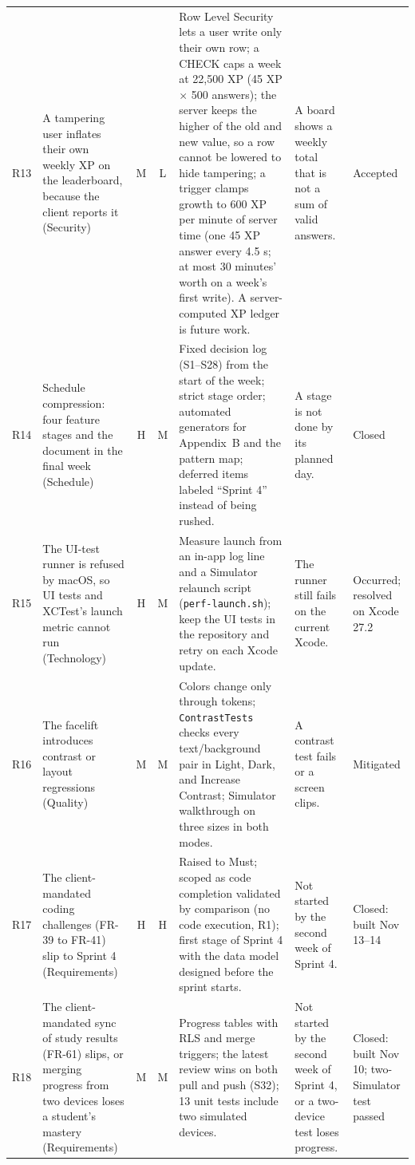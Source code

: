 \documentclass[12pt,letterpaper]{article}
\begin{document}
\begin{xltabular}{\textwidth}{@{}l L{3.0cm} c c Y L{2.9cm} L{1.7cm}@{}}
R13 & A tampering user inflates their own weekly XP on the leaderboard, because the client reports it (Security) & M & L & Row Level Security lets a user write only their own row; a CHECK caps a week at 22,500 XP (45 XP $\times$ 500 answers); the server keeps the higher of the old and new value, so a row cannot be lowered to hide tampering; a trigger clamps growth to 600 XP per minute of server time (one 45 XP answer every 4.5 s; at most 30 minutes' worth on a week's first write). A server-computed XP ledger is future work. & A board shows a weekly total that is not a sum of valid answers. & Accepted \\
R14 & Schedule compression: four feature stages and the document in the final week (Schedule) & H & M & Fixed decision log (S1--S28) from the start of the week; strict stage order; automated generators for Appendix~B and the pattern map; deferred items labeled ``Sprint 4'' instead of being rushed. & A stage is not done by its planned day. & Closed \\
R15 & The UI-test runner is refused by macOS, so UI tests and XCTest's launch metric cannot run (Technology) & H & M & Measure launch from an in-app log line and a Simulator relaunch script (\texttt{perf-launch.sh}); keep the UI tests in the repository and retry on each Xcode update. & The runner still fails on the current Xcode. & Occurred; resolved on Xcode 27.2 \\
R16 & The facelift introduces contrast or layout regressions (Quality) & M & M & Colors change only through tokens; \texttt{ContrastTests} checks every text/background pair in Light, Dark, and Increase Contrast; Simulator walkthrough on three sizes in both modes. & A contrast test fails or a screen clips. & Mitigated \\
R17 & The client-mandated coding challenges (FR-39 to FR-41) slip to Sprint 4 (Requirements) & H & H & Raised to Must; scoped as code completion validated by comparison (no code execution, R1); first stage of Sprint 4 with the data model designed before the sprint starts. & Not started by the second week of Sprint 4. & Closed: built Nov 13--14 \\
R18 & The client-mandated sync of study results (FR-61) slips, or merging progress from two devices loses a student's mastery (Requirements) & M & M & Progress tables with RLS and merge triggers; the latest review wins on both pull and push (S32); 13 unit tests include two simulated devices. & Not started by the second week of Sprint 4, or a two-device test loses progress. & Closed: built Nov 10; two-Simulator test passed \\

\end{xltabular}
\end{document}
